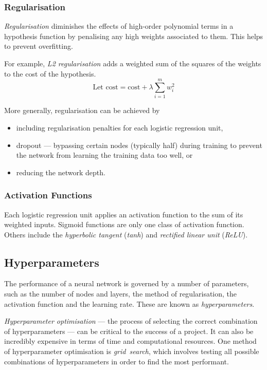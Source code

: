 \subsubsection{Regularisation}

\emph{Regularisation} diminishes the effects of high-order polynomial terms in a hypothesis function by penalising any high weights associated to them.
This helps to prevent overfitting.

For example, \emph{L2 regularisation} adds a weighted sum of the squares of the weights to the cost of the hypothesis.
\begin{equation*}
  \text{Let cost} = \text{cost} + \lambda \sum_{i=1}^{m} w_{i}^{2}
\end{equation*}

More generally, regularisation can be achieved by
\begin{itemize}
  \item including regularisation penalties for each logistic regression unit,
  \item dropout --- bypassing certain nodes (typically half) during training to prevent the network from learning the training data too well, or
  \item reducing the network depth.
\end{itemize}

\subsubsection{Activation Functions}

Each logistic regression unit applies an activation function to the sum of its weighted inputs.
Sigmoid functions are only one class of activation function.
Others include the \emph{hyperbolic tangent} (\emph{tanh}) and \emph{rectified linear unit} (\emph{ReLU}).

\subsection{Hyperparameters}

The performance of a neural network is governed by a number of parameters, such as the number of nodes and layers, the method of regularisation, the activation function and the learning rate.
These are known as \emph{hyperparameters}.

\emph{Hyperparameter optimisation} --- the process of selecting the correct combination of hyperparameters --- can be critical to the success of a project.
It can also be incredibly expensive in terms of time and computational resources.
One method of hyperparameter optimisation is \emph{grid~search}, which involves testing all possible combinations of hyperparameters in order to find the most performant.

